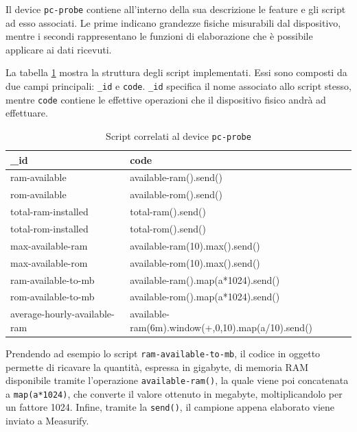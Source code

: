 Il device \texttt{pc-probe} contiene all'interno della sua descrizione le feature e gli script ad esso associati. Le prime indicano grandezze fisiche misurabili dal dispositivo, mentre i secondi rappresentano le funzioni di elaborazione che è possibile applicare ai dati ricevuti. 

La tabella \ref{script} mostra la struttura degli script implementati. Essi sono composti da due campi principali: \texttt{\_id} e \texttt{code}.  \texttt{\_id} specifica il nome associato allo script stesso, mentre \texttt{code} contiene le effettive operazioni che il dispositivo fisico andrà ad effettuare. 

\begin{table}[H]
	\begin{tabular}{|p{}|p{}|}
		\hline
		\textbf{\_id} & \textbf{code} \\
		\hline
		ram-available & available-ram().send()\\
		\hline
		rom-available & available-rom().send()\\
		\hline
		total-ram-installed & total-ram().send()\\
		\hline
		total-rom-installed & total-rom().send()\\
		\hline
		max-available-ram & available-ram(10).max().send()\\	
		\hline
		max-available-rom & available-rom(10).max().send()\\
		\hline	
		ram-available-to-mb & available-ram().map(a*1024).send()\\
		\hline
		rom-available-to-mb & available-rom().map(a*1024).send()\\
		\hline
		average-hourly-available-ram & available-ram(6m).window(+,0,10).map(a/10).send()\\
		\hline
	\end{tabular}
	\caption{Script correlati al device \texttt{pc-probe}}
	\label{script}
\end{table}

Prendendo ad esempio lo script \texttt{ram-available-to-mb}, il codice in oggetto permette di ricavare la quantità, espressa in gigabyte, di memoria RAM disponibile tramite l’operazione \texttt{available-ram()}, la quale viene poi concatenata a \texttt{map(a*1024)}, che converte il valore ottenuto in megabyte, moltiplicandolo per un fattore 1024. Infine, tramite la \texttt{send()}, il campione appena elaborato viene inviato a Measurify.

